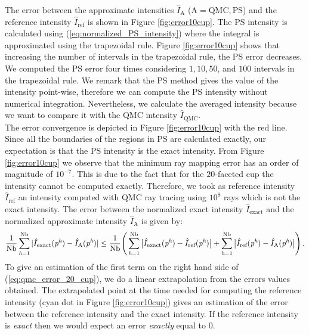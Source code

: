 The error between the approximate intensities $\hat{I}_{\textrm{A}}$ ($\textrm{A} = \textrm{QMC}, \textrm{PS}$) and the reference intensity $\hat{I}_{\textrm{ref}}$ is shown in Figure \ref{fig:error10cup}. 
The PS intensity is calculated using (\ref{eq:normalized_PS_intensity}) where the integral is approximated using the trapezoidal rule. Figure \ref{fig:error10cup} shows that increasing the number of intervals in the trapezoidal rule, the PS error decreases. We computed the PS error four times considering $1, 10, 50$, and $100$ intervals in the trapezoidal rule. 
We remark that the PS method gives the value of the intensity point-wise, therefore we can compute the PS intensity without numerical integration. Nevertheless, we calculate the averaged intensity because we want to compare it with the QMC intensity $\hat{I}_{\textrm{QMC}}$.
\\ \indent The error convergence is depicted in Figure \ref{fig:error10cup} with the red line.
Since all the boundaries of the regions in PS are calculated exactly, our expectation is that the PS intensity is the exact intensity.
From Figure \ref{fig:error10cup} we observe that the minimum ray mapping error has an order of magnitude of $10^{-7}$.
This is due to the fact that for the $20$-faceted cup the intensity cannot be computed exactly. 
Therefore, we took as reference intensity $\hat{I}_{\textrm{ref}}$ an intensity computed with QMC ray tracing using $10^8$ rays which is not the exact intensity.
The error between the normalized exact intensity $\hat{I}_{\textrm{exact}}$ and the normalized approximate intensity $\hat{I}_{\textrm{A}}$ is given by:
\begin{equation}\label{eq:qmc_error_20_cup}
\frac{1}{\textrm{Nb}}\sum_{\textit{h} = 1}^{\textrm{Nb}}| \hat{I}_{\textrm{exact}}(\textit{p}^{\textit{h}}) - \hat{I}_{\textrm{A}}(\textit{p}^{\textit{h}})| \leq
\frac{1}{\textrm{Nb}}\Bigg(\sum_{\textit{h} = 1}^{\textrm{Nb}}\big| \hat{I}_{\textrm{exact}}(\textit{p}^{\textit{h}}) - \hat{I}_{\textrm{ref}}(\textit{p}^{\textit{h}})\big| +
\sum_{\textit{h} = 1}^{\textrm{Nb}}\big| \hat{I}_{\textrm{ref}}(\textit{p}^{\textit{h}}) - \hat{I}_{\textrm{A}}(\textit{p}^{\textit{h}})\big|\Bigg)\,.
\end{equation}
To give an estimation of the first term on the right hand side of (\ref{eq:qmc_error_20_cup}), we do a linear extrapolation from the errors values obtained. The extrapolated point at the time needed for computing the reference intensity (cyan dot in Figure \ref{fig:error10cup}) gives an estimation of the error between the reference intensity and the exact intensity. If the reference intensity is \textit{exact} then we would expect an error \textit{exactly} equal to $0$.
